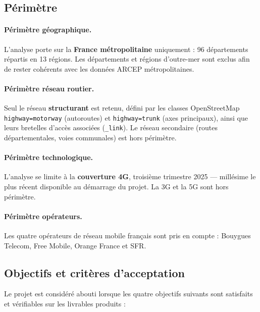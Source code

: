 \documentclass[11pt,a4paper]{article}
\begin{document}
\subsection{Périmètre}

\paragraph{Périmètre géographique.}
L'analyse porte sur la \textbf{France métropolitaine} uniquement : 96 départements répartis en 13 régions. Les départements et régions d'outre-mer sont exclus afin de rester cohérents avec les données ARCEP métropolitaines.

\paragraph{Périmètre réseau routier.}
Seul le réseau \textbf{structurant} est retenu, défini par les classes OpenStreetMap \texttt{highway=motorway} (autoroutes) et \texttt{highway=trunk} (axes principaux), ainsi que leurs bretelles d'accès associées (\texttt{\_link}). Le réseau secondaire (routes départementales, voies communales) est hors périmètre.

\paragraph{Périmètre technologique.}
L'analyse se limite à la \textbf{couverture 4G}, troisième trimestre 2025 — millésime le plus récent disponible au démarrage du projet. La 3G et la 5G sont hors périmètre.

\paragraph{Périmètre opérateurs.}
Les quatre opérateurs de réseau mobile français sont pris en compte : Bouygues Telecom, Free Mobile, Orange France et SFR.

\subsection{Objectifs et critères d'acceptation}

Le projet est considéré abouti lorsque les quatre objectifs suivants sont satisfaits et vérifiables sur les livrables produits :
\end{document}
